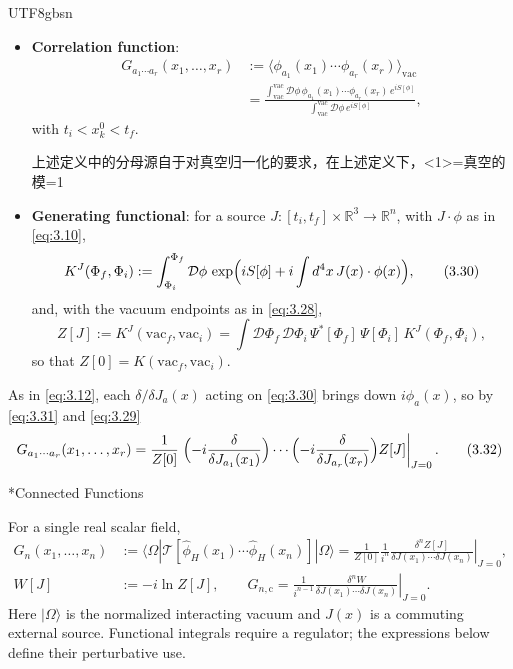 \documentclass[11pt,a4paper,oneside]{report}
\makeatletter
\newcommand\topic{\@startsection{paragraph}{4}{\z@}{-1.7ex plus -.3ex}{.5ex}{\normalfont\normalsize\bfseries\itshape\boldmath}*}
\makeatother
\begin{document}
\begin{CJK*}{UTF8}{gbsn}
\begin{itemize}
\item \textbf{\boldmath Correlation function}: 
\begin{equation*}
{\displaystyle 
\begin{aligned}
G_{a_1\cdots a_r}(x_1,\ldots,x_r)&:=\langle \phi_{a_1}(x_1)\cdots\phi_{a_r}(x_r)\rangle_{\mathrm{vac}}\\
&=\frac{\int_{\mathrm{vac}}^{\mathrm{vac}}\mathcal D\phi\,\phi_{a_1}(x_1)\cdots\phi_{a_r}(x_r)\,e^{iS[\phi]}}{\int_{\mathrm{vac}}^{\mathrm{vac}}\mathcal D\phi\,e^{iS[\phi]}},
\end{aligned}}
\tag{3.29}\label{eq:3.29}
\end{equation*}
with $t_i<x_k^0<t_f$.

上述定义中的分母源自于对真空归一化的要求，在上述定义下，\textless{}1\textgreater{}=真空的模=1

\item \textbf{\boldmath Generating functional}: for a source $J:[t_i,t_f]\times\mathbb R^3\to\mathbb R^n$, with $J\cdot\phi$ as in \eqref{eq:3.10},
\begin{equation*}
K^J(\Phi_f,\Phi_i):=\int_{\Phi_i}^{\Phi_f}\mathcal D\phi\,\exp\Bigl(iS[\phi]+i\int d^4x\,J(x)\cdot\phi(x)\Bigr),
\tag{3.30}\label{eq:3.30}
\end{equation*}
and, with the vacuum endpoints as in \eqref{eq:3.28},
\begin{equation*}
{\displaystyle 
Z[J]:=K^J(\mathrm{vac}_f,\mathrm{vac}_i)
=\int\mathcal D\Phi_f\,\mathcal D\Phi_i\,\Psi^*[\Phi_f]\,\Psi[\Phi_i]\,K^J(\Phi_f,\Phi_i),}
\tag{3.31}\label{eq:3.31}
\end{equation*}
so that $Z[0]=K(\mathrm{vac}_f,\mathrm{vac}_i)$.
\end{itemize}


As in \eqref{eq:3.12}, each $\delta/\delta J_a(x)$ acting on \eqref{eq:3.30} brings down $i\phi_a(x)$, so by \eqref{eq:3.31} and \eqref{eq:3.29}
\begin{equation*}
{\displaystyle G_{a_1\cdots a_r}(x_1,\ldots,x_r)=\frac{1}{Z[0]}\left.\Bigl(-i\frac{\delta}{\delta J_{a_1}(x_1)}\Bigr)\cdots\Bigl(-i\frac{\delta}{\delta J_{a_r}(x_r)}\Bigr)Z[J]\right|_{J=0}.}
\tag{3.32}\label{eq:3.32}
\end{equation*}

\topic{Connected Functions}

For a single real scalar field,
\begin{equation*}
\begin{aligned}
G_n(x_1,\ldots,x_n)&:=\langle\Omega|\mathcal T[\hat\phi_H(x_1)\cdots\hat\phi_H(x_n)]|\Omega\rangle
=\left.\frac{1}{Z[0]}\frac{1}{i^n}\frac{\delta^n Z[J]}{\delta J(x_1)\cdots\delta J(x_n)}\right|_{J=0},\\
W[J]&:=-i\ln Z[J],\qquad
G_{n,\mathrm c}=\left.\frac{1}{i^{n-1}}\frac{\delta^nW}{\delta J(x_1)\cdots\delta J(x_n)}\right|_{J=0}.
\end{aligned}
\tag{3.33}\label{eq:3.33}
\end{equation*}
Here $|\Omega\rangle$ is the normalized interacting vacuum and $J(x)$ is a commuting external source. Functional integrals require a regulator; the expressions below define their perturbative use.


\end{CJK*}
\end{document}
